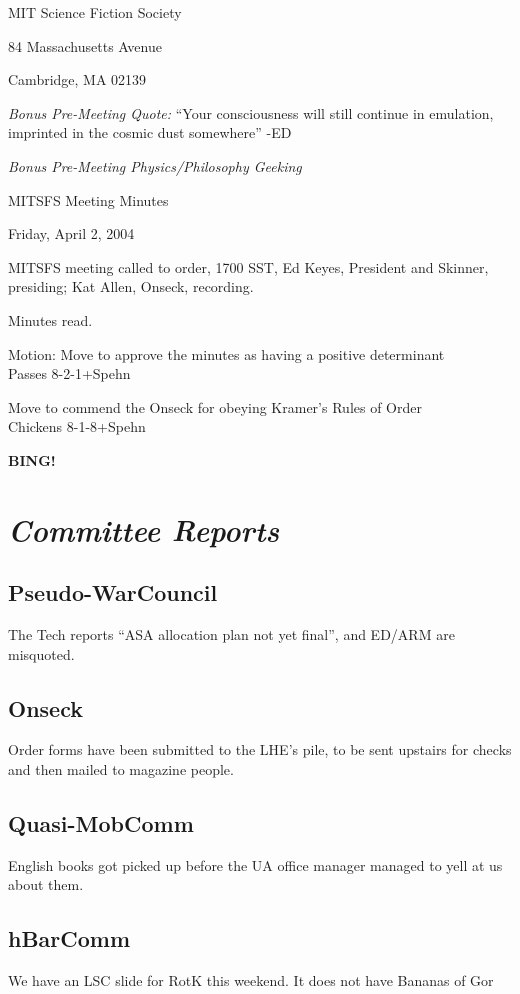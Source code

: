 \documentclass[10pt]{article}
\newcommand{\bing}{{\bf BING!} }
\newcommand{\goto}[1]{\bing \vskip 12pt \section*{{\em{#1}}}}
\begin{document}
\begin{center}

MIT Science Fiction Society 

84 Massachusetts Avenue

Cambridge, MA 02139

\vspace{12pt}
\emph{Bonus Pre-Meeting Quote:}
``Your consciousness will still continue in emulation, imprinted in
the cosmic dust somewhere'' -ED

\emph{Bonus Pre-Meeting Physics/Philosophy Geeking}

MITSFS Meeting Minutes 

Friday, April 2, 2004

\end{center}
 
\vspace{18pt}

\setlength{\parskip}{6pt}

\noindent
MITSFS meeting called to order, 1700 SST, Ed Keyes, President and
Skinner, presiding; Kat Allen,  Onseck, recording.

Minutes read.

Motion: Move to approve the minutes as having a positive determinant\\
Passes 8-2-1+Spehn

Move to commend the Onseck for obeying Kramer's Rules of Order\\
Chickens 8-1-8+Spehn

\goto{Committee Reports}
\subsection*{Pseudo-WarCouncil}
The Tech reports ``ASA allocation plan not yet final'', and ED/ARM are
misquoted.

\subsection*{Onseck}
Order forms have been submitted to the LHE's pile, to be sent upstairs
for checks and then mailed to magazine people.

\subsection*{Quasi-MobComm}
English books got picked up before the UA office manager managed to
yell at us about them.

\subsection*{hBarComm}
We have an LSC slide for RotK this weekend. It does not have Bananas
of Gor
\end{document}

